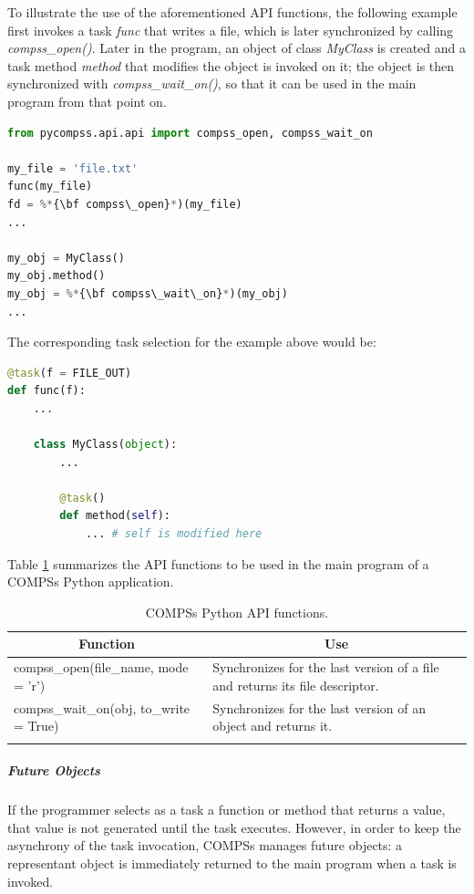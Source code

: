 To illustrate the use of the aforementioned API functions, the following example first invokes a task 
{\it func} that writes a file, which is later synchronized by calling {\it compss\_open()}. 
Later in the program, an object of class {\it MyClass} is created and a task method {\it method} 
that modifies the object is invoked on it; the object is then synchronized with {\it compss\_wait\_on()}, 
so that it can be used in the main program from that point on.

\begin{lstlisting}[language=python]
from pycompss.api.api import compss_open, compss_wait_on

my_file = 'file.txt'
func(my_file)
fd = %*{\bf compss\_open}*)(my_file)
...

my_obj = MyClass()
my_obj.method()
my_obj = %*{\bf compss\_wait\_on}*)(my_obj)
...
\end{lstlisting}

The corresponding task selection for the example above would be:

\begin{lstlisting}[language=python]
@task(f = FILE_OUT)
def func(f):
    ...
    
    class MyClass(object):
        ...
        
        @task()
        def method(self):
            ... # self is modified here
\end{lstlisting}

Table \ref{tab:python_api_functions} summarizes the API functions to be used in the main program of a COMPSs Python application.

\begin{longtable}{| p{} | p{} |}
\hline
\multicolumn{1}{|c|}{{\bf Function }}    &  \multicolumn{1}{c|}{{\bf Use }}\\
\hline
compss\_open(file\_name, mode = 'r') & Synchronizes for the last version of a file and returns its file descriptor. \\
\hline
compss\_wait\_on(obj, to\_write = True) & Synchronizes for the last version of an object and returns it. \\
\hline
\caption{COMPSs Python API functions.}
\label{tab:python_api_functions}
\end{longtable}


\subparagraph{Future Objects}
If the programmer selects as a task a function or method that returns a value, that value is not 
generated until the task executes. However, in order to keep the asynchrony of the task invocation, 
COMPSs manages future objects: a representant object is immediately returned to the main program when 
a task is invoked.

